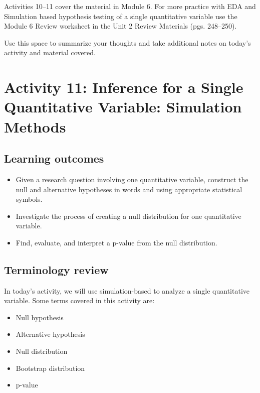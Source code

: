 \documentclass[
]{report}
\begin{document}
Activities 10--11 cover the material in Module 6. For more practice with EDA and Simulation based hypothesis testing of a single quantitative variable use the Module 6 Review worksheet in the Unit 2 Review Materials (pgs. 248--250).

Use this space to summarize your thoughts and take additional notes on today's activity and material covered.

\newpage

\section{Activity 11: Inference for a Single Quantitative Variable: Simulation Methods}\label{activity-11-inference-for-a-single-quantitative-variable-simulation-methods}


\subsection{Learning outcomes}\label{learning-outcomes-11}

\begin{itemize}
\item
  Given a research question involving one quantitative variable, construct the null and alternative hypotheses
  in words and using appropriate statistical symbols.
\item
  Investigate the process of creating a null distribution for one quantitative variable.
\item
  Find, evaluate, and interpret a p-value from the null distribution.
\end{itemize}

\subsection{Terminology review}\label{terminology-review-9}

In today's activity, we will use simulation-based to analyze a single quantitative variable. Some terms covered in this activity are:

\begin{itemize}
\item
  Null hypothesis
\item
  Alternative hypothesis
\item
  Null distribution
\item
  Bootstrap distribution
\item
  p-value
\end{itemize}
\end{document}
